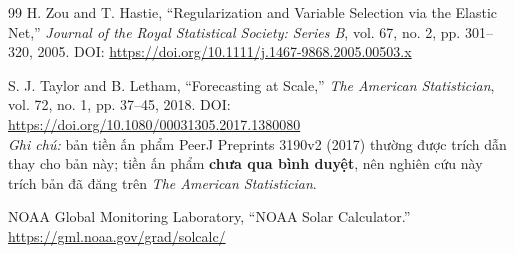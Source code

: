 \documentclass[12pt,a4paper]{article}
\begin{document}
\begin{thebibliography}{99}
H. Zou and T. Hastie,
``Regularization and Variable Selection via the Elastic Net,''
\textit{Journal of the Royal Statistical Society: Series B}, vol. 67, no. 2, pp. 301--320, 2005.
DOI: \url{https://doi.org/10.1111/j.1467-9868.2005.00503.x}

S. J. Taylor and B. Letham,
``Forecasting at Scale,''
\textit{The American Statistician}, vol. 72, no. 1, pp. 37--45, 2018.
DOI: \url{https://doi.org/10.1080/00031305.2017.1380080}
\\ \textit{Ghi chú:} bản tiền ấn phẩm PeerJ Preprints 3190v2 (2017) thường được trích dẫn thay cho bản này; tiền ấn phẩm \textbf{chưa qua bình duyệt}, nên nghiên cứu này trích bản đã đăng trên \textit{The American Statistician}.

NOAA Global Monitoring Laboratory,
``NOAA Solar Calculator.''
\url{https://gml.noaa.gov/grad/solcalc/}
\end{thebibliography}
\end{document}
